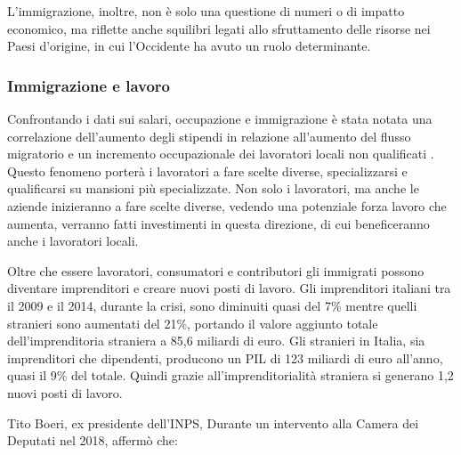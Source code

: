\documentclass[12pt]{book} %
\begin{document}
L’immigrazione, inoltre, non è solo una questione di numeri o di impatto economico, ma riflette anche squilibri legati allo sfruttamento delle risorse nei Paesi d’origine, in cui l’Occidente ha avuto un ruolo determinante.

\bigskip

\subsubsection{Immigrazione e lavoro}
Confrontando i dati sui salari, occupazione e immigrazione è stata notata una correlazione dell'aumento degli stipendi
in relazione all'aumento del flusso migratorio e un incremento occupazionale dei lavoratori locali non qualificati    .
Questo fenomeno porterà i lavoratori a fare scelte diverse, specializzarsi e qualificarsi su mansioni più specializzate. 
Non solo i lavoratori, ma anche le aziende inizieranno a fare scelte diverse, vedendo una potenziale forza
lavoro che aumenta, verranno fatti investimenti in questa direzione, di cui beneficeranno anche i lavoratori locali.

Oltre che essere lavoratori, consumatori e contributori gli immigrati possono diventare imprenditori e creare nuovi
posti di lavoro.
Gli imprenditori italiani tra il 2009 e il 2014, durante la crisi, sono diminuiti quasi del 7\% mentre quelli stranieri
sono aumentati del 21\%, portando il valore aggiunto
totale dell'imprenditoria straniera a 85,6 miliardi di
euro. 
Gli stranieri in Italia, sia imprenditori che dipendenti, producono un PIL di 123 miliardi di euro all'anno, quasi il 9\% del
totale. Quindi grazie all'imprenditorialità straniera si generano 1,2 nuovi posti di lavoro. 

Tito Boeri, ex presidente dell'INPS, Durante un intervento alla Camera dei Deputati nel 2018, affermò che:
\end{document}

